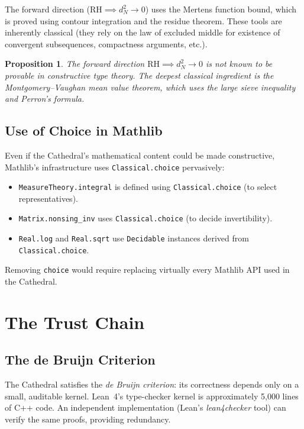 \documentclass[11pt,a4paper]{article}
\theoremstyle{plain}
\newtheorem{proposition}[theorem]{Proposition}
\theoremstyle{definition}
\newcommand{\lean}[1]{\texttt{#1}}
\newcommand{\RH}{\ensuremath{\mathrm{RH}}}
\begin{document}
The forward direction ($\RH \implies d_N^2 \to 0$) uses the Mertens
function bound, which is proved using contour integration and the
residue theorem. These tools are inherently classical (they rely on
the law of excluded middle for existence of convergent subsequences,
compactness arguments, etc.).

\begin{proposition}
The forward direction $\RH \implies d_N^2 \to 0$ is not known to be
provable in constructive type theory. The deepest classical ingredient
is the Montgomery--Vaughan mean value theorem, which uses the large
sieve inequality and Perron's formula.
\end{proposition}

\subsection{Use of Choice in Mathlib}

Even if the Cathedral's mathematical content could be made constructive,
Mathlib's infrastructure uses \lean{Classical.choice} pervasively:

\begin{itemize}
  \item \lean{MeasureTheory.integral} is defined using
    \lean{Classical.choice} (to select representatives).
  \item \lean{Matrix.nonsing\_inv} uses \lean{Classical.choice}
    (to decide invertibility).
  \item \lean{Real.log} and \lean{Real.sqrt} use \lean{Decidable}
    instances derived from \lean{Classical.choice}.
\end{itemize}

Removing \lean{choice} would require replacing virtually every
Mathlib API used in the Cathedral.

\section{The Trust Chain}
\label{sec:trust}

\subsection{The de Bruijn Criterion}

The Cathedral satisfies the \emph{de Bruijn criterion}: its
correctness depends only on a small, auditable kernel. Lean~4's
type-checker kernel is approximately 5{,}000 lines of C++ code. An
independent implementation (Lean's \emph{lean4checker} tool) can
verify the same proofs, providing redundancy.
\end{document}
